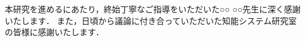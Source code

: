 \begin{acknowledgments}
本研究を進めるにあたり，終始丁寧なご指導をいただいた○○ ○○先生に深く感謝いたします．
また，日頃から議論に付き合っていただいた知能システム研究室の皆様に感謝いたします．
\end{acknowledgments}
